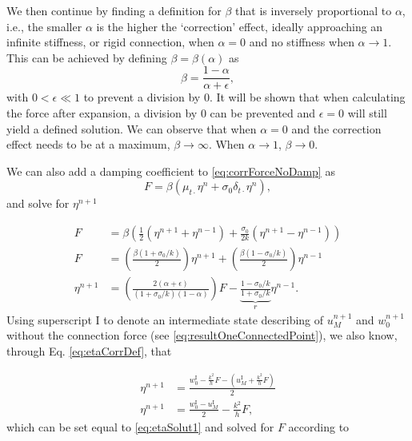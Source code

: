 \documentclass[dvipsnames]{article}
\begin{document}
We then continue by finding a definition for $\beta$ that is inversely proportional to $\alpha$, i.e., the smaller $\alpha$ is the higher the `correction' effect, ideally approaching an infinite stiffness, or rigid connection, when $\alpha = 0$ and no stiffness when $\alpha \rightarrow 1$. This can be achieved by defining $\beta = \beta(\alpha)$ as
\def\plusEps{+ \epsilon}
\def\alfPlusEps{(\alpha \plusEps)}
\begin{equation}
    \beta = \frac{1 - \alpha}{\alpha \plusEps},
\end{equation}
with $0<\epsilon \ll 1$ to prevent a division by 0. It will be shown that when calculating the force after expansion, a division by 0 can be prevented and $\epsilon = 0$ will still yield a defined solution. We can observe that when $\alpha = 0$ and the correction effect needs to be at a maximum, $\beta\rightarrow \infty$. When $\alpha \rightarrow 1$, $\beta \rightarrow 0$.

We can also add a damping coefficient to \eqref{eq:corrForceNoDamp} as
\begin{equation}\label{eq:corrForce}
    F = \beta \left(\mu_{t\cdot}\eta^n +\sigma_0\delta_{t\cdot}\eta^n \right),
\end{equation}
and solve for $\eta^{n+1}$ 

\begin{align}
    F &= \beta\left(\frac{1}{2}\left(\eta^{n+1}+\eta^{n-1}\right) + \frac{\sigma_0}{2k}\left(\eta^{n+1}-\eta^{n-1}\right)\right)\nonumber\\
    F&= \left(\frac{\beta (1 + \sigma_0/k)}{2}\right)\eta^{n+1} + \left(\frac{\beta (1 - \sigma_0/k)}{2}\right) \eta^{n-1}\nonumber\\
    \eta^{n+1} &= \left(\frac{2
    \alfPlusEps}{(1+\sigma_0/k)(1-\alpha)}\right)F - \underbrace{\frac{1-\sigma_0/k}{1+\sigma_0/k}}_{r}\eta^{n-1}.\label{eq:etaSolut1}
\end{align}
Using superscript $\text{I}$ to denote an intermediate state describing of $u^{n+1}_M$ and $w^{n+1}_0$ without the connection force (see \eqref{eq:resultOneConnectedPoint}), we also know, through Eq. \eqref{eq:etaCorrDef}, that 

\begin{align}
    \eta^{n+1} &= \frac{w_0^\text{I}-\frac{k^2}{h}F-\left(u_M^\text{I}+\frac{k^2}{h}F\right)}{2}\nonumber\\
    \eta^{n+1} &= \frac{w_0^\text{I} - u_M^\text{I}}{2} - \frac{k^2}{h}F,
\end{align}
which can be set equal to \eqref{eq:etaSolut1} and solved for $F$ according to 
\end{document}
